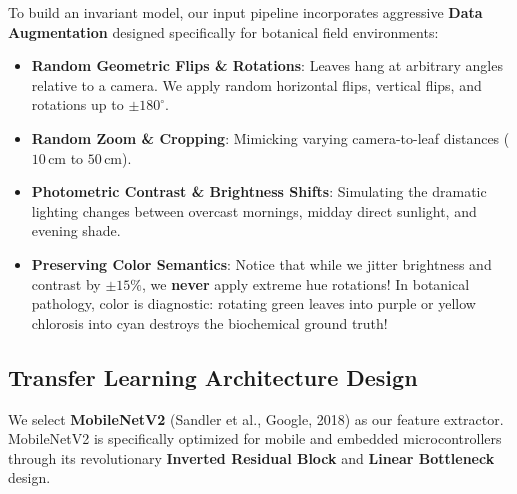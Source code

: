 To build an invariant model, our input pipeline incorporates aggressive \textbf{Data Augmentation} designed specifically for botanical field environments:
\begin{itemize}
    \item \textbf{Random Geometric Flips \& Rotations}: Leaves hang at arbitrary angles relative to a camera. We apply random horizontal flips, vertical flips, and rotations up to $\pm 180^\circ$.
    \item \textbf{Random Zoom \& Cropping}: Mimicking varying camera-to-leaf distances ($10\,\text{cm}$ to $50\,\text{cm}$).
    \item \textbf{Photometric Contrast \& Brightness Shifts}: Simulating the dramatic lighting changes between overcast mornings, midday direct sunlight, and evening shade.
    \item \textbf{Preserving Color Semantics}: Notice that while we jitter brightness and contrast by $\pm 15\%$, we \textbf{never} apply extreme hue rotations! In botanical pathology, color is diagnostic: rotating green leaves into purple or yellow chlorosis into cyan destroys the biochemical ground truth!
\end{itemize}

\subsection{Transfer Learning Architecture Design}\label{subsec:p2_architecture}

We select \textbf{MobileNetV2} (Sandler et al., Google, 2018) as our feature extractor. MobileNetV2 is specifically optimized for mobile and embedded microcontrollers through its revolutionary \textbf{Inverted Residual Block} and \textbf{Linear Bottleneck} design.

